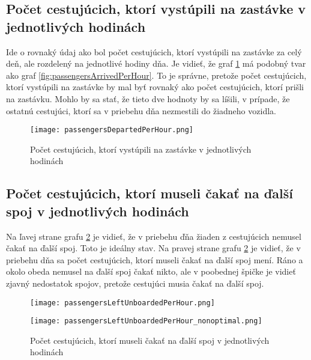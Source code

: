 \subsection*{Počet cestujúcich, ktorí vystúpili na zastávke v jednotlivých hodinách}
Ide o rovnaký údaj ako bol počet cestujúcich, ktorí vystúpili na zastávke za celý deň, ale rozdelený na jednotlivé hodiny dňa.
Je vidieť, že graf \ref{fig:passengersDepartedPerHour} má podobný tvar ako graf \ref{fig:passengersArrivedPerHour}.
To je správne, pretože počet cestujúcich, ktorí vystúpili na zastávke by mal byť rovnaký ako počet cestujúcich, ktorí prišli na zastávku.
Mohlo by sa stať, že tieto dve hodnoty by sa líšili, v prípade, že ostatnú cestujúci, ktorí sa v priebehu dňa nezmestili do žiadneho vozidla.
\begin{figure}[h]
  \label{fig:passengersDepartedPerHour}
  \centering
  \texttt{[image: passengersDepartedPerHour.png]}
  \caption{Počet cestujúcich, ktorí vystúpili na zastávke v jednotlivých hodinách}
\end{figure}

\subsection*{Počet cestujúcich, ktorí museli čakať na ďalší spoj v jednotlivých hodinách}
Na ľavej strane grafu \ref{fig:passengersLeftUnboardedPerHour} je vidieť, že v priebehu ďňa žiaden z cestujúcich nemusel čakať na ďalší spoj.
Toto je ideálny stav.
Na pravej strane grafu \ref{fig:passengersLeftUnboardedPerHour} je vidieť, že v priebehu dňa sa počet cestujúcich, ktorí museli čakať na ďalší spoj mení.
Ráno a okolo obeda nemusel na ďalší spoj čakať nikto, ale v poobednej špičke je vidieť zjavný nedostatok spojov, pretože cestujúci musia čakať na ďalší spoj.
\begin{figure}[h]
  \label{fig:passengersLeftUnboardedPerHour}
  \centering
  \begin{minipage}{0.49\textwidth}
    \texttt{[image: passengersLeftUnboardedPerHour.png]}
  \end{minipage}
  \begin{minipage}{0.49\textwidth}
    \texttt{[image: passengersLeftUnboardedPerHour\_nonoptimal.png]}
  \end{minipage}
  \caption{Počet cestujúcich, ktorí museli čakať na ďalší spoj v jednotlivých hodinách}
\end{figure}

